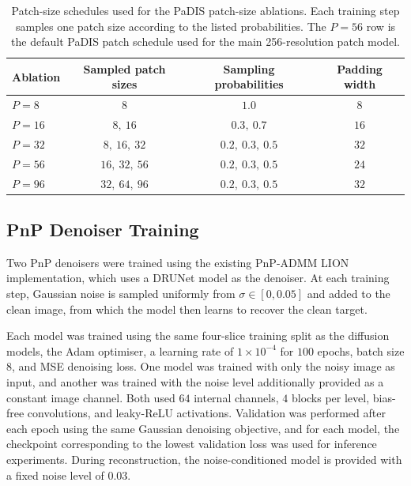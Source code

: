 \begin{table}[ht] 
    \centering 
    \begin{tabular}{lccc} 
        \hline 
        \textbf{Ablation} & \textbf{Sampled patch sizes} & \textbf{Sampling probabilities} & \textbf{Padding width} \\ 
        \hline 
        $P=8$ & $8$ & $1.0$ & $8$ \\ 
        $P=16$ & $8,\ 16$ & $0.3,\ 0.7$ & $16$ \\ 
        $P=32$ & $8,\ 16,\ 32$ & $0.2,\ 0.3,\ 0.5$ & $32$ \\ 
        $P=56$ & $16,\ 32,\ 56$ & $0.2,\ 0.3,\ 0.5$ & $24$ \\ 
        $P=96$ & $32,\ 64,\ 96$ & $0.2,\ 0.3,\ 0.5$ & $32$ \\ 
        \hline 
    \end{tabular} 
    \caption{Patch-size schedules used for the PaDIS patch-size ablations. Each training step samples one patch size according to the listed probabilities. The $P=56$ row is the default PaDIS patch schedule used for the main 256-resolution patch model.} 
    \label{tab:patch_size_schedules}
\end{table}

\subsection{PnP Denoiser Training}
Two PnP denoisers were trained using the existing PnP-ADMM \cite{chan_plug-and-play_2016} LION implementation, which uses a DRUNet model \cite{zhang_plug-and-play_2021} as the denoiser. At each training step, Gaussian noise is sampled uniformly from $\sigma \in[0,0.05]$ and added to the clean image, from which the model then learns to recover the clean target. 

Each model was trained using the same four-slice training split as the diffusion models, the Adam optimiser, a learning rate of $1\times 10^{-4}$ for $100$ epochs, batch size $8$, and MSE denoising loss. One model was trained with only the noisy image as input, and another was trained with the noise level additionally provided as a constant image channel. Both used $64$ internal channels, $4$ blocks per level, bias-free convolutions, and leaky-ReLU activations. Validation was performed after each epoch using the same Gaussian denoising objective, and for each model, the checkpoint corresponding to the lowest validation loss was used for inference experiments. During reconstruction, the noise-conditioned model is provided with a fixed noise level of $0.03$.

